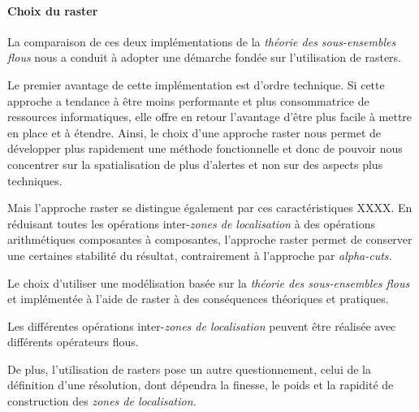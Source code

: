 \paragraph{Choix du raster}


La comparaison de ces deux implémentations de la \emph{théorie des
  sous-ensembles flous} nous a conduit à adopter une démarche fondée sur
l'utilisation de rasters.




Le premier avantage de cette implémentation est d'ordre technique. Si
cette approche a tendance à être moins performante et plus
consommatrice de ressources informatiques, elle offre en retour
l'avantage d'être plus facile à mettre en place et à étendre. Ainsi,
le choix d'une approche raster nous permet de développer plus
rapidement une méthode fonctionnelle et donc de pouvoir nous
concentrer sur la spatialisation de plus d'alertes et non sur des
aspects plus techniques.


Mais l'approche raster se distingue également par ces caractéristiques
XXXX. En réduisant toutes les opérations inter-\emph{zones de
  localisation} à des opérations arithmétiques composantes à
composantes, l'approche raster permet de conserver une certaines
stabilité du résultat, contrairement à l'approche par
\emph{alpha-cuts.}


Le choix d'utiliser une modélisation basée sur la \emph{théorie des
  sous-ensembles flous} et implémentée à l'aide de raster à des
conséquences théoriques et pratiques.


Les différentes opérations inter-\emph{zones de localisation} peuvent
être réalisée avec différents opérateurs flous.


De plus, l'utilisation de rasters pose un autre questionnement, celui
de la définition d'une résolution, dont dépendra la finesse, le poids
et la rapidité de construction des \emph{zones de localisation.}


